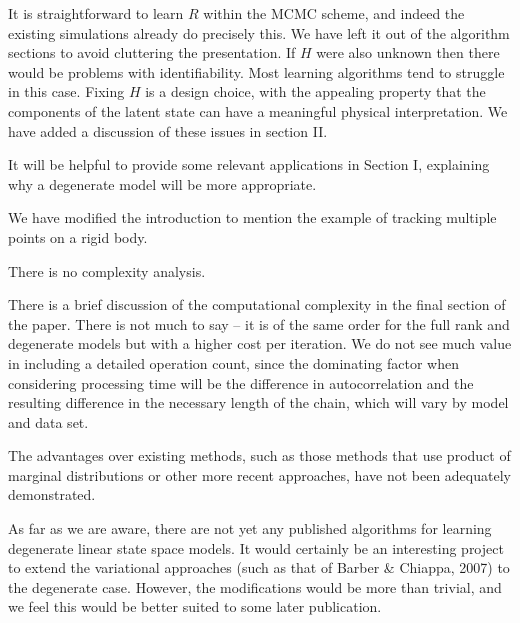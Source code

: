 \documentclass{article}
\newenvironment{review}[0]{\begin{itshape}\color{Gray}\noindent}{\end{itshape}\vspace{0.4cm}}
\newenvironment{response}[0]{\noindent}{\vspace{0.4cm}}
\begin{document}
\begin{response}
 It is straightforward to learn $R$ within the MCMC scheme, and indeed the existing simulations already do precisely this. We have left it out of the algorithm sections to avoid cluttering the presentation. If $H$ were also unknown then there would be problems with identifiability. Most learning algorithms tend to struggle in this case. Fixing $H$ is a design choice, with the appealing property that the components of the latent state can have a meaningful physical interpretation. We have added a discussion of these issues in section II.
\end{response}

\begin{review}
It will be helpful to provide some relevant applications in Section I, explaining why a degenerate model will be more appropriate.
\end{review}

\begin{response}
We have modified the introduction to mention the example of tracking multiple points on a rigid body.
\end{response}

\begin{review}
There is no complexity analysis.
\end{review}

\begin{response}
There is a brief discussion of the computational complexity in the final section of the paper. There is not much to say -- it is of the same order for the full rank and degenerate models but with a higher cost per iteration. We do not see much value in including a detailed operation count, since the dominating factor when considering processing time will be the difference in autocorrelation and the resulting difference in the necessary length of the chain, which will vary by model and data set.
\end{response}

\begin{review}
The advantages over existing methods, such as those methods that use product of marginal distributions or other more recent approaches, have not been adequately demonstrated.
\end{review}

\begin{response}
 As far as we are aware, there are not yet any published algorithms for learning degenerate linear state space models. It would certainly be an interesting project to extend the variational approaches (such as that of Barber \& Chiappa, 2007) to the degenerate case. However, the modifications would be more than trivial, and we feel this would be better suited to some later publication.
\end{response}
\end{document}
